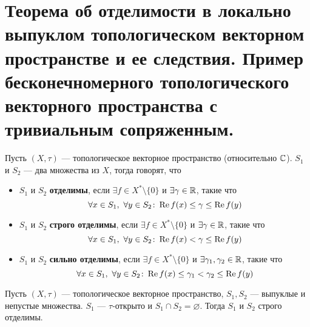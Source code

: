\newpage
\section{Теорема об отделимости в локально выпуклом топологическом векторном пространстве и ее следствия. Пример бесконечномерного топологического векторного пространства с тривиальным сопряженным.}
\begin{definition}
	Пусть $(X,\tau)$ --- топологическое векторное пространство (относительно $\mathbb{C}$). $S_1$ и $S_2$ --- два множества из $X$, тогда говорят, что 
	\begin{itemize}
		\item $S_1$ и $S_2$ \textbf{отделимы}, если $\exists f \in X^* \setminus\{0\}$ и $\exists \gamma \in \mathbb{R}$, такие что 
		$$
		\forall x \in S_1, \ \forall y \in S_2 \colon \operatorname{Re} f(x) \leq \gamma \leq \operatorname{Re} f(y)
		$$
		\item $S_1$ и $S_2$ \textbf{строго отделимы}, если $\exists f \in X^* \setminus\{0\}$ и $\exists \gamma \in \mathbb{R}$, такие что 
		$$
		\forall x \in S_1, \ \forall y \in S_2 \colon \operatorname{Re} f(x) < \gamma \leq \operatorname{Re} f(y)
		$$
		\item $S_1$ и $S_2$ \textbf{сильно отделимы}, если $\exists f \in X^* \setminus\{0\}$ и $\exists \gamma_1, \gamma_2 \in \mathbb{R}$, такие что 
		$$
		\forall x \in S_1, \ \forall y \in S_2 \colon \operatorname{Re} f(x) \leq \gamma_1 < \gamma_2 \leq  \operatorname{Re} f(y)
		$$
	\end{itemize}
\end{definition}
\begin{theorem}
	Пусть $(X,\tau)$ --- топологическое векторное пространство, $S_1, S_2$ --- выпуклые и непустые множества. $S_1$ --- $\tau$-открыто и $S_1 \cap S_2 = \varnothing$. Тогда $S_1$ и $S_2$ строго отделимы.
\end{theorem}

